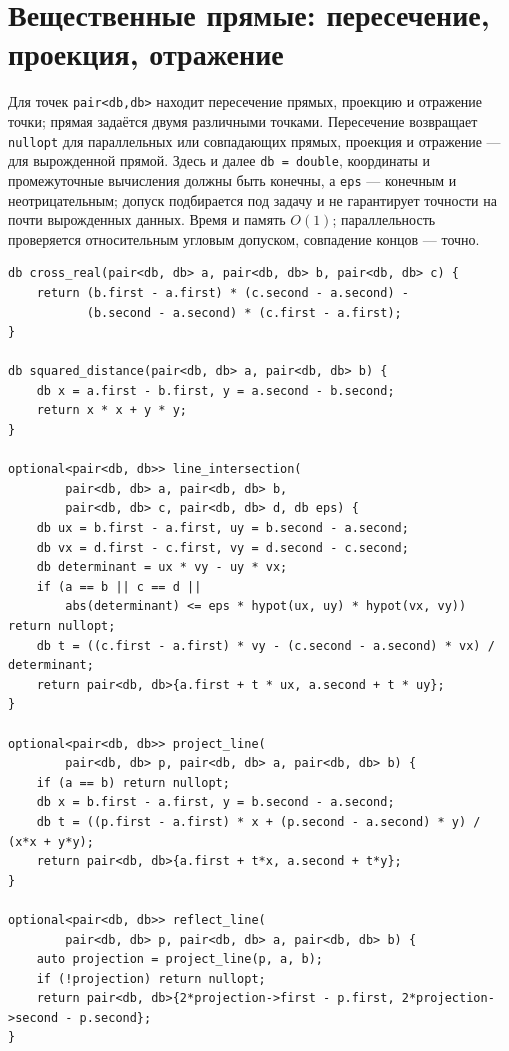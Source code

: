 \section{Вещественные прямые: пересечение, проекция, отражение}
Для точек \texttt{pair<db,db>} находит пересечение прямых, проекцию и отражение точки; прямая задаётся двумя различными точками.
Пересечение возвращает \texttt{nullopt} для параллельных или совпадающих прямых, проекция и отражение --- для вырожденной прямой.
Здесь и далее \texttt{db = double}, координаты и промежуточные вычисления должны быть конечны, а \texttt{eps} --- конечным и неотрицательным; допуск подбирается под задачу и не гарантирует точности на почти вырожденных данных.
Время и память $O(1)$; параллельность проверяется относительным угловым допуском, совпадение концов --- точно.
\begin{lstlisting}[name=geometry_lines]
db cross_real(pair<db, db> a, pair<db, db> b, pair<db, db> c) {
    return (b.first - a.first) * (c.second - a.second) -
           (b.second - a.second) * (c.first - a.first);
}

db squared_distance(pair<db, db> a, pair<db, db> b) {
    db x = a.first - b.first, y = a.second - b.second;
    return x * x + y * y;
}

optional<pair<db, db>> line_intersection(
        pair<db, db> a, pair<db, db> b,
        pair<db, db> c, pair<db, db> d, db eps) {
    db ux = b.first - a.first, uy = b.second - a.second;
    db vx = d.first - c.first, vy = d.second - c.second;
    db determinant = ux * vy - uy * vx;
    if (a == b || c == d ||
        abs(determinant) <= eps * hypot(ux, uy) * hypot(vx, vy)) return nullopt;
    db t = ((c.first - a.first) * vy - (c.second - a.second) * vx) / determinant;
    return pair<db, db>{a.first + t * ux, a.second + t * uy};
}

optional<pair<db, db>> project_line(
        pair<db, db> p, pair<db, db> a, pair<db, db> b) {
    if (a == b) return nullopt;
    db x = b.first - a.first, y = b.second - a.second;
    db t = ((p.first - a.first) * x + (p.second - a.second) * y) / (x*x + y*y);
    return pair<db, db>{a.first + t*x, a.second + t*y};
}

optional<pair<db, db>> reflect_line(
        pair<db, db> p, pair<db, db> a, pair<db, db> b) {
    auto projection = project_line(p, a, b);
    if (!projection) return nullopt;
    return pair<db, db>{2*projection->first - p.first, 2*projection->second - p.second};
}
\end{lstlisting}
